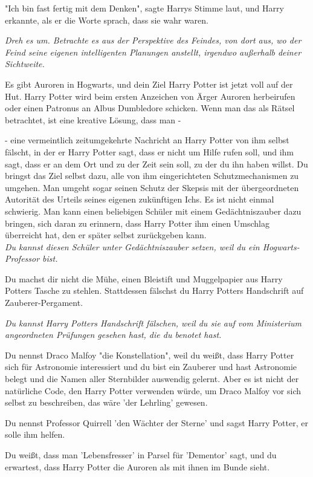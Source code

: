 {"Ich bin fast fertig mit dem Denken", sagte Harrys Stimme laut, und Harry erkannte, als er die Worte sprach, dass sie wahr waren.

\emph{Dreh es um. Betrachte es aus der Perspektive des Feindes, von dort aus, wo der Feind seine eigenen intelligenten Planungen anstellt, irgendwo außerhalb deiner Sichtweite.}

Es gibt Auroren in Hogwarts, und dein Ziel Harry Potter ist jetzt voll auf der Hut. Harry Potter wird beim ersten Anzeichen von Ärger Auroren herbeirufen oder einen Patronus an Albus Dumbledore schicken. Wenn man das als Rätsel betrachtet, ist eine kreative Lösung, dass man -

- eine vermeintlich zeitumgekehrte Nachricht an Harry Potter von ihm selbst fälscht, in der er Harry Potter sagt, dass er nicht um Hilfe rufen soll, und ihm sagt, dass er an dem Ort und zu der Zeit sein soll, zu der du ihn haben willst. Du bringst das Ziel selbst dazu, alle von ihm eingerichteten Schutzmechanismen zu umgehen. Man umgeht sogar seinen Schutz der Skepsis mit der übergeordneten Autorität des Urteils seines eigenen zukünftigen Ichs. Es ist nicht einmal schwierig. Man kann einen beliebigen Schüler mit einem Gedächtniszauber dazu bringen, sich daran zu erinnern, dass Harry Potter ihm einen Umschlag überreicht hat, den er später selbst zurückgeben kann.\\ \emph{\hfill\break Du kannst diesen Schüler unter Gedächtniszauber setzen, weil du ein Hogwarts-Professor bist.}

Du machst dir nicht die Mühe, einen Bleistift und Muggelpapier aus Harry Potters Tasche zu stehlen. Stattdessen fälschst du Harry Potters Handschrift auf Zauberer-Pergament.

\emph{Du kannst Harry Potters Handschrift fälschen, weil du sie auf vom Ministerium angeordneten Prüfungen gesehen hast, die du benotet hast.}

Du nennst Draco Malfoy "die Konstellation", weil du weißt, dass Harry Potter sich für Astronomie interessiert und du bist ein Zauberer und hast Astronomie belegt und die Namen aller Sternbilder auswendig gelernt. Aber es ist nicht der natürliche Code, den Harry Potter verwenden würde, um Draco Malfoy vor sich selbst zu beschreiben, das wäre 'der Lehrling' gewesen.

Du nennst Professor Quirrell 'den Wächter der Sterne' und sagst Harry Potter, er solle ihm helfen.

Du weißt, dass man 'Lebensfresser' in Parsel für 'Dementor' sagt, und du erwartest, dass Harry Potter die Auroren als mit ihnen im Bunde sieht.

}

